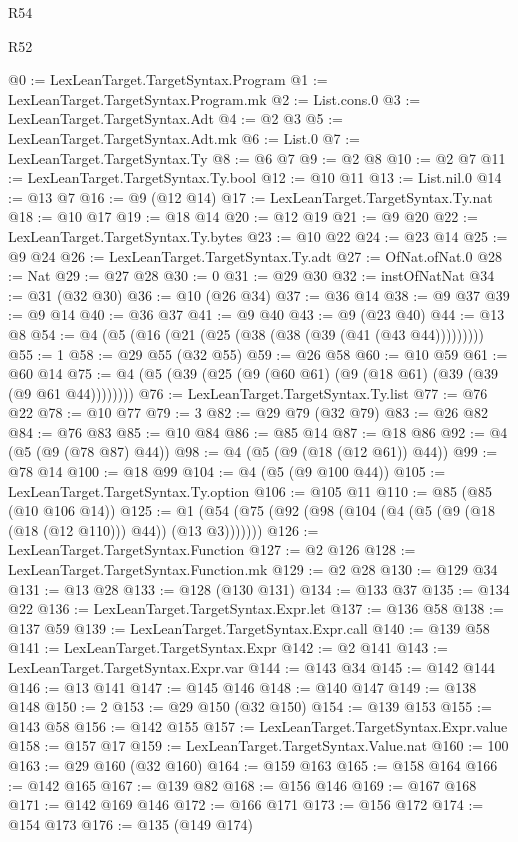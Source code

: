 \begin{lexlean}{R54}
\begin{lexlean}{R52}
\begin{coremodule}
{{{{{{{{{{{{{{{{{{{{{{{{{{{{{{{{{{{{{{{{{{{{{{{{{{{{{{{{{{{{{{{{{{{{{{{{{{{{{{{{{{{{{{{{{{{{{{{{{{{{{{{{{{{{{{{{{{{{{{{{{{{{{{{{{{{{{{{{{{{{{{{{{{{{{{{{{{{{{{{{{{{{{{{{{{{{{{{{{{{{{{{{{{{{{{{{{{{{{{@0 := LexLeanTarget.TargetSyntax.Program
@1 := LexLeanTarget.TargetSyntax.Program.mk
@2 := List.cons.{0}
@3 := LexLeanTarget.TargetSyntax.Adt
@4 := @2 @3
@5 := LexLeanTarget.TargetSyntax.Adt.mk
@6 := List.{0}
@7 := LexLeanTarget.TargetSyntax.Ty
@8 := @6 @7
@9 := @2 @8
@10 := @2 @7
@11 := LexLeanTarget.TargetSyntax.Ty.bool
@12 := @10 @11
@13 := List.nil.{0}
@14 := @13 @7
@16 := @9 (@12 @14)
@17 := LexLeanTarget.TargetSyntax.Ty.nat
@18 := @10 @17
@19 := @18 @14
@20 := @12 @19
@21 := @9 @20
@22 := LexLeanTarget.TargetSyntax.Ty.bytes
@23 := @10 @22
@24 := @23 @14
@25 := @9 @24
@26 := LexLeanTarget.TargetSyntax.Ty.adt
@27 := OfNat.ofNat.{0}
@28 := Nat
@29 := @27 @28
@30 := 0
@31 := @29 @30
@32 := instOfNatNat
@34 := @31 (@32 @30)
@36 := @10 (@26 @34)
@37 := @36 @14
@38 := @9 @37
@39 := @9 @14
@40 := @36 @37
@41 := @9 @40
@43 := @9 (@23 @40)
@44 := @13 @8
@54 := @4 (@5 (@16 (@21 (@25 (@38 (@38 (@39 (@41 (@43 @44)))))))))
@55 := 1
@58 := @29 @55 (@32 @55)
@59 := @26 @58
@60 := @10 @59
@61 := @60 @14
@75 := @4 (@5 (@39 (@25 (@9 (@60 @61) (@9 (@18 @61) (@39 (@39 (@9 @61 @44))))))))
@76 := LexLeanTarget.TargetSyntax.Ty.list
@77 := @76 @22
@78 := @10 @77
@79 := 3
@82 := @29 @79 (@32 @79)
@83 := @26 @82
@84 := @76 @83
@85 := @10 @84
@86 := @85 @14
@87 := @18 @86
@92 := @4 (@5 (@9 (@78 @87) @44))
@98 := @4 (@5 (@9 (@18 (@12 @61)) @44))
@99 := @78 @14
@100 := @18 @99
@104 := @4 (@5 (@9 @100 @44))
@105 := LexLeanTarget.TargetSyntax.Ty.option
@106 := @105 @11
@110 := @85 (@85 (@10 @106 @14))
@125 := @1 (@54 (@75 (@92 (@98 (@104 (@4 (@5 (@9 (@18 (@18 (@12 @110))) @44)) (@13 @3)))))))
@126 := LexLeanTarget.TargetSyntax.Function
@127 := @2 @126
@128 := LexLeanTarget.TargetSyntax.Function.mk
@129 := @2 @28
@130 := @129 @34
@131 := @13 @28
@133 := @128 (@130 @131)
@134 := @133 @37
@135 := @134 @22
@136 := LexLeanTarget.TargetSyntax.Expr.let
@137 := @136 @58
@138 := @137 @59
@139 := LexLeanTarget.TargetSyntax.Expr.call
@140 := @139 @58
@141 := LexLeanTarget.TargetSyntax.Expr
@142 := @2 @141
@143 := LexLeanTarget.TargetSyntax.Expr.var
@144 := @143 @34
@145 := @142 @144
@146 := @13 @141
@147 := @145 @146
@148 := @140 @147
@149 := @138 @148
@150 := 2
@153 := @29 @150 (@32 @150)
@154 := @139 @153
@155 := @143 @58
@156 := @142 @155
@157 := LexLeanTarget.TargetSyntax.Expr.value
@158 := @157 @17
@159 := LexLeanTarget.TargetSyntax.Value.nat
@160 := 100
@163 := @29 @160 (@32 @160)
@164 := @159 @163
@165 := @158 @164
@166 := @142 @165
@167 := @139 @82
@168 := @156 @146
@169 := @167 @168
@171 := @142 @169 @146
@172 := @166 @171
@173 := @156 @172
@174 := @154 @173
@176 := @135 (@149 @174)
}}}}}}}}}}}}}}}}}}}}}}}}}}}}}}}}}}}}}}}}}}}}}}}}}}}}}}}}}}}}}}}}}}}}}}}}}}}}}}}}}}}}}}}}}}}}}}}}}}}}}}}}}}}}}}}}}}}}}}}}}}}}}}}}}}}}}}}}}}}}}}}}}}}}}}}}}}}}}}}}}}}}}}}}}}}}}}}}}}}}}}}}}}}}}}}}}}}}}}
\end{coremodule}
\end{lexlean}
\end{lexlean}
